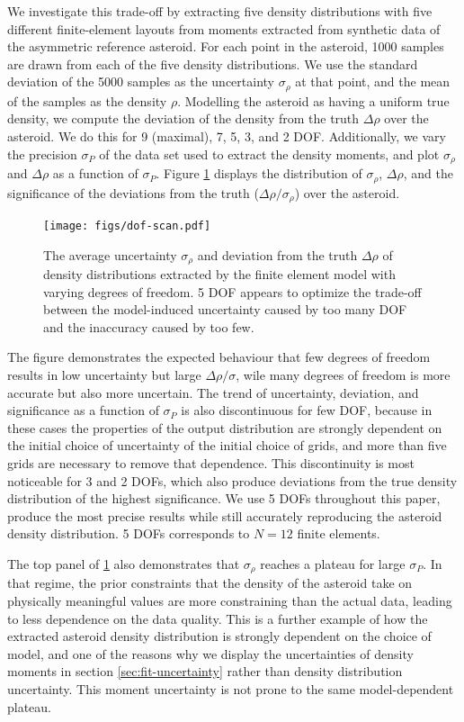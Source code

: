 \documentclass[fleqn,usenatbib]{mnras}
\begin{document}
We investigate this trade-off by extracting five density distributions with five different finite-element layouts from moments extracted from synthetic data of the asymmetric reference asteroid. For each point in the asteroid, 1000 samples are drawn from each of the five density distributions. We use the standard deviation of the 5000 samples as the uncertainty $\sigma_\rho$ at that point, and the mean of the samples as the density $\rho$. Modelling the asteroid as having a uniform true density, we compute the deviation of the density from the truth $\Delta \rho$ over the asteroid. We do this for 9 (maximal), 7, 5, 3, and 2 DOF. Additionally, we vary the precision $\sigma_P$ of the data set used to extract the density moments, and plot $\sigma_\rho$ and $\Delta \rho$ as a function of $\sigma_P$. Figure \ref{fig:dof-scan} displays the distribution of $\sigma_\rho$, $\Delta \rho$, and the significance of the deviations from the truth ($\Delta \rho / \sigma_\rho$) over the asteroid.

\begin{figure}
  \texttt{[image: figs/dof-scan.pdf]}
  \caption{The average uncertainty $\sigma_\rho$ and deviation from the truth $\Delta \rho$ of density distributions extracted by the finite element model with varying degrees of freedom. 5 DOF appears to optimize the trade-off between the model-induced uncertainty caused by too many DOF and the inaccuracy caused by too few.}
  \label{fig:dof-scan}
\end{figure}

The figure demonstrates the expected behaviour that few degrees of freedom results in low uncertainty but large $\Delta \rho / \sigma$, wile many degrees of freedom is more accurate but also more uncertain. The trend of uncertainty, deviation, and significance as a function of $\sigma_P$ is also discontinuous for few DOF, because in these cases the properties of the output distribution are strongly dependent on the initial choice of uncertainty of the initial choice of grids, and more than five grids are necessary to remove that dependence. This discontinuity is most noticeable for 3 and 2 DOFs, which also produce deviations from the true density distribution of the highest significance. We use 5 DOFs throughout this paper, produce the most precise results while still accurately reproducing the asteroid density distribution. 5 DOFs corresponds to $N=12$ finite elements.

The top panel of \ref{fig:dof-scan} also demonstrates that $\sigma_\rho$ reaches a plateau for large $\sigma_P$. In that regime, the prior constraints that the density of the asteroid take on physically meaningful values are more constraining than the actual data, leading to less dependence on the data quality. This is a further example of how the extracted asteroid density distribution is strongly dependent on the choice of model, and one of the reasons why we display the uncertainties of density moments in section \ref{sec:fit-uncertainty} rather than density distribution uncertainty. This moment uncertainty is not prone to the same model-dependent plateau.
\end{document}
